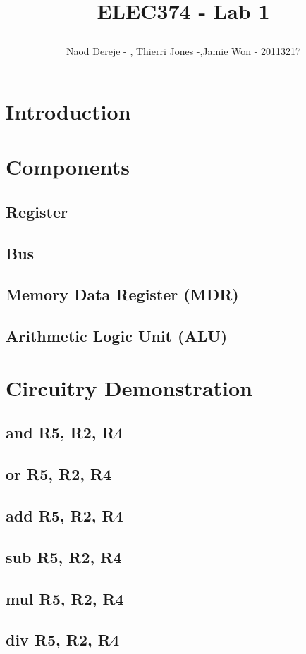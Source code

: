 \documentclass{article}
\title{
    \begin{large}
        ELEC374 - Lab 1
    \end{large}
}
\author{Naod Dereje - , Thierri Jones -,Jamie Won - 20113217}
\begin{document}
\maketitle
\cleardoublepage
\tableofcontents
\cleardoublepage

\section{Introduction}
\section{Components}
\subsection{Register}
\subsection{Bus}
\subsection{Memory Data Register (MDR)}
\subsection{Arithmetic Logic Unit (ALU)}
\section{Circuitry Demonstration}
\subsection{and R5, R2, R4}
\subsection{or R5, R2, R4}
\subsection{add R5, R2, R4}
\subsection{sub R5, R2, R4}
\subsection{mul R5, R2, R4}
\subsection{div R5, R2, R4}
\end{document}
